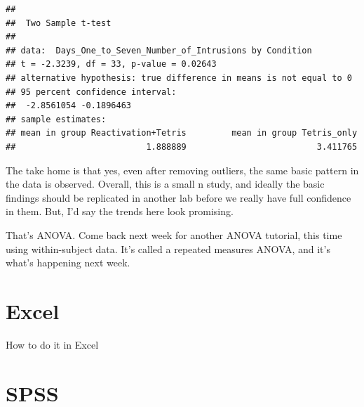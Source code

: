 \documentclass[]{book}
\newenvironment{Shaded}{\begin{snugshade}}{\end{snugshade}}
\newcommand{\KeywordTok}[1]{\textcolor[rgb]{0.13,0.29,0.53}{\textbf{{#1}}}}
\newcommand{\DataTypeTok}[1]{\textcolor[rgb]{0.13,0.29,0.53}{{#1}}}
\newcommand{\StringTok}[1]{\textcolor[rgb]{0.31,0.60,0.02}{{#1}}}
\newcommand{\OtherTok}[1]{\textcolor[rgb]{0.56,0.35,0.01}{{#1}}}
\newcommand{\NormalTok}[1]{{#1}}
\theoremstyle{definition}
\theoremstyle{definition}
\theoremstyle{definition}
\theoremstyle{remark}
\begin{document}
\begin{Shaded}
\end{Shaded}

\begin{verbatim}
## 
##  Two Sample t-test
## 
## data:  Days_One_to_Seven_Number_of_Intrusions by Condition
## t = -2.3239, df = 33, p-value = 0.02643
## alternative hypothesis: true difference in means is not equal to 0
## 95 percent confidence interval:
##  -2.8561054 -0.1896463
## sample estimates:
## mean in group Reactivation+Tetris         mean in group Tetris_only 
##                          1.888889                          3.411765
\end{verbatim}

The take home is that yes, even after removing outliers, the same basic
pattern in the data is observed. Overall, this is a small n study, and
ideally the basic findings should be replicated in another lab before we
really have full confidence in them. But, I'd say the trends here look
promising.

That's ANOVA. Come back next week for another ANOVA tutorial, this time
using within-subject data. It's called a repeated measures ANOVA, and
it's what's happening next week.

\section{Excel}\label{excel-7}

How to do it in Excel

\section{SPSS}\label{spss-7}
\end{document}
